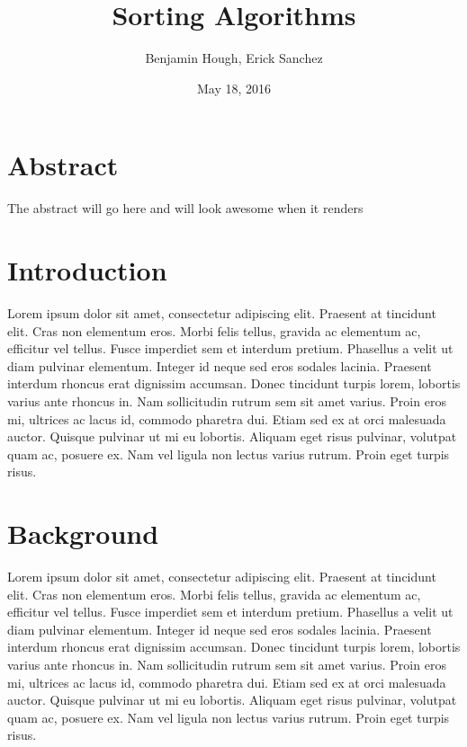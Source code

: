 \documentclass[12pt]{article}
\title{\bfseries Sorting Algorithms}
\author{Benjamin Hough, Erick Sanchez}
\date{May 18, 2016}
\begin{document}
	
	\maketitle
	
	
	\section*{Abstract}
	
	The abstract will go here and will look awesome when it renders

	\tableofcontents
	
	\pagebreak
	


	\section{Introduction}
	
	Lorem ipsum dolor sit amet, consectetur adipiscing elit. Praesent at tincidunt elit. Cras non elementum eros. Morbi felis tellus, gravida ac elementum ac, efficitur vel tellus. Fusce imperdiet sem et interdum pretium. Phasellus a velit ut diam pulvinar elementum. Integer id neque sed eros sodales lacinia. Praesent interdum rhoncus erat dignissim accumsan. Donec tincidunt turpis lorem, lobortis varius ante rhoncus in. Nam sollicitudin rutrum sem sit amet varius. Proin eros mi, ultrices ac lacus id, commodo pharetra dui. Etiam sed ex at orci malesuada auctor. Quisque pulvinar ut mi eu lobortis. Aliquam eget risus pulvinar, volutpat quam ac, posuere ex. Nam vel ligula non lectus varius rutrum. Proin eget turpis risus.
	
	
	
	\section{Background}
	
	Lorem ipsum dolor sit amet, consectetur adipiscing elit. Praesent at tincidunt elit. Cras non elementum eros. Morbi felis tellus, gravida ac elementum ac, efficitur vel tellus. Fusce imperdiet sem et interdum pretium. Phasellus a velit ut diam pulvinar elementum. Integer id neque sed eros sodales lacinia. Praesent interdum rhoncus erat dignissim accumsan. Donec tincidunt turpis lorem, lobortis varius ante rhoncus in. Nam sollicitudin rutrum sem sit amet varius. Proin eros mi, ultrices ac lacus id, commodo pharetra dui. Etiam sed ex at orci malesuada auctor. Quisque pulvinar ut mi eu lobortis. Aliquam eget risus pulvinar, volutpat quam ac, posuere ex. Nam vel ligula non lectus varius rutrum. Proin eget turpis risus.
	
\end{document}
